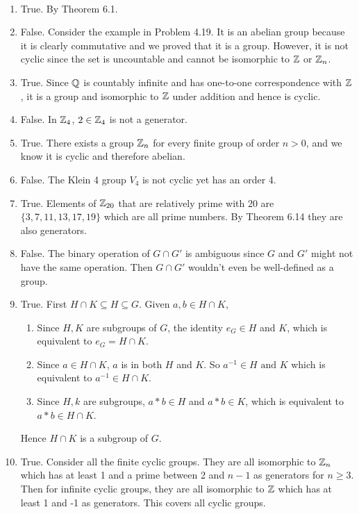 \documentclass[12pt]{article}
\begin{document}
\begin{problem}[6.32]
~\begin{enumerate}[label=\alph*)]
	\item True. By Theorem 6.1.
	\item False. Consider the example in Problem 4.19. It is an abelian group because it is clearly commutative and we proved that it is a group. However, it is not cyclic since the set is uncountable and cannot be isomorphic to $ \mathbb{Z}$ or $ \mathbb{Z}_n$.
	\item True. Since $ \mathbb{Q}$ is countably infinite and has one-to-one correspondence with $ \mathbb{Z}$, it is a group and isomorphic to $ \mathbb{Z}$ under addition and hence is cyclic.
	\item False. In $ \mathbb{Z}_4$, $ 2\in \mathbb{Z}_4$ is not a generator.
	\item True. There exists a group $ \mathbb{Z}_n$ for every finite group of order $ n>0$, and we know it is cyclic and therefore abelian.
	\item False. The Klein 4 group $V_4$ is not cyclic yet has an order 4.
	\item True. Elements of $ \mathbb{Z}_{20}$ that are relatively prime with 20 are $ \{3,7,11,13,17,19\} $ which are all prime numbers. By Theorem 6.14 they are also generators.
	\item False. The binary operation of $ G \cap G'$ is ambiguous since $ G$ and  $ G'$ might not have the same operation. Then  $ G \cap G'$ wouldn't even be well-defined as a group.
	\item True. First  $ H \cap K \subseteq H \subseteq G$. Given $ a,b \in H \cap K$,
		\begin{enumerate}[label=(\roman*)]
			\item Since $ H,K$ are subgroups of  $ G$, the identity $e_G \in H$ and $ K$, which is equivalent to  $ e_G = H \cap K$.
			\item Since $ a \in H \cap K$, $ a$ is in both  $ H$ and  $ K$. So  $ a^{-1} \in H \text{ and } K $ which is equivalent to $ a^{-1} \in H \cap K$.
			\item Since $ H,k$ are subgroups,  $ a * b \in H$ and $a*b \in K $, which is equivalent to $ a*b \in H \cap K$.
		\end{enumerate}
		Hence $ H \cap K$ is a subgroup of $ G$.
	\item True. Consider all the finite cyclic groups. They are all isomorphic to $ \mathbb{Z}_n$ which has at least 1 and a prime between 2 and $ n-1$ as generators for  $ n\geq 3$. Then for infinite cyclic groups, they are all isomorphic to  $ \mathbb{Z}$ which has at least 1 and -1 as generators. This covers all cyclic groups.

\end{enumerate}

\end{problem}
\end{document}
